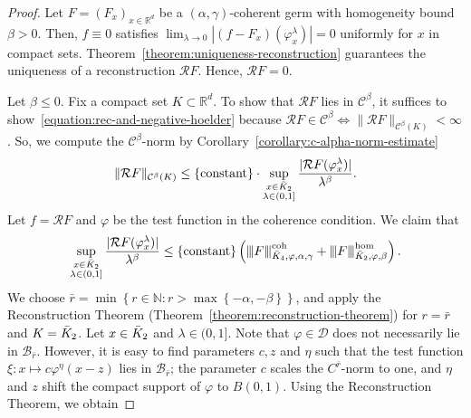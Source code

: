 \begin{proof}
  Let \( F = (F_x)_{x \in \mathbb{R}^d} \) be a \( (\alpha, \gamma) \)-coherent germ with homogeneity bound \( \beta > 0 \). Then, \( f \equiv 0 \) satisfies \( \lim_{\lambda \to 0} |(f-F_x)(\varphi^\lambda_x)| = 0 \) uniformly for \( x \) in compact sets. Theorem~\ref{theorem:uniqueness-reconstruction} guarantees the uniqueness of a reconstruction \( \mathcal{R}F \). Hence, \( \mathcal{R}F = 0 \).

  Let \( \beta \leq 0 \). Fix a compact set \( K \subset \mathbb{R}^d \). To show that \( \mathcal{R}F \) lies in \( \mathcal{C}^\beta \), it suffices to show~\eqref{equation:rec-and-negative-hoelder} because \( \mathcal{R}F \in \mathcal{C}^\beta \iff \lVert \mathcal{R}F \rVert_{\mathcal{C}^\beta(K)} < \infty \). So, we compute the \( \mathcal{C}^\beta \)-norm by Corollary~\ref{corollary:c-alpha-norm-estimate}
  \begin{align*}
    \lVert \mathcal{R}F \rVert_{\mathcal{C}^\beta(K)}  
    \leq  
    \{ \mathrm{constant} \} \cdot \sup_{\substack{x \in \bar{K}_{2} \\ \lambda \in (0,1]}} 
    \frac{|\mathcal{R}F(\varphi^{\lambda}_x)|}{\lambda^\beta}.
  \end{align*}
  Let \( f = \mathcal{R}F \) and \( \varphi \) be the test function in the coherence condition. We claim that 
  \begin{align*}
    \sup_{\substack{x \in \bar{K}_{2} \\ \lambda \in (0,1]}} 
    \frac{|\mathcal{R}F(\varphi^{\lambda}_x)|}{\lambda^\beta} \leq \left\{  \mathrm{constant} \right\} \left( {\left\vert\kern-0.25ex\left\vert\kern-0.25ex\left\vert F \right\vert\kern-0.25ex\right\vert\kern-0.25ex\right\vert}^{\mathrm{coh}}_{\bar{K}_{4}, \varphi, \alpha, \gamma} + {\left\vert\kern-0.25ex\left\vert\kern-0.25ex\left\vert F \right\vert\kern-0.25ex\right\vert\kern-0.25ex\right\vert}^{\mathrm{\hom}}_{\bar{K}_{2}, \varphi, \beta} \right).
  \end{align*}
  We choose \( \bar r = \min\left\{ r \in \mathbb{N} : r > \max\left\{ -\alpha, -\beta \right\}\right\} \), and apply the Reconstruction Theorem (Theorem~\ref{theorem:reconstruction-theorem}) for \( r = \bar r \) and \( K = \bar{K}_{2} \). Let \( x \in \bar{K}_{2} \) and \( \lambda \in (0,1] \). Note that \( \varphi \in \mathcal{D} \) does not necessarily lie in \( \mathcal{B}_{\bar r} \). However, it is easy to find parameters \( c, z \) and \( \eta \) such that the test function \( \xi: x \mapsto c \varphi^{\eta}(x - z) \) lies in \( \mathcal{B}_{\bar r} \); the parameter \( c \) scales the \( C^{\bar r} \)-norm to one, and \( \eta \) and \( z \) shift the compact support of \( \varphi \) to \( B(0,1) \). Using the Reconstruction Theorem, we obtain

\end{proof}
